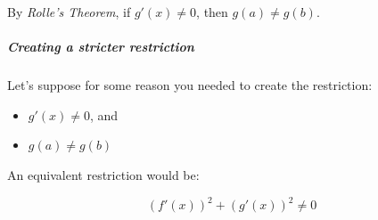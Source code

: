 \documentclass[class=article, crop=false]{standalone}
\begin{document}
By \emph{Rolle's Theorem}, if \(g'(x) \neq 0\), then \(g(a) \neq g(b)\).

\hypertarget{header-n4056}{%
\subparagraph{Creating a stricter restriction}\label{header-n4056}}

Let's suppose for some reason you needed to create the restriction:

\begin{itemize}
\item
  \(g'(x) \neq 0\), and
\item
  \(g(a) \neq g(b)\) 
\end{itemize}

An equivalent restriction would be:

\[\left( f'\left( x \right) \right)^{2} + \left( g'\left( x \right) \right)^{2} \neq 0\]
\end{document}
